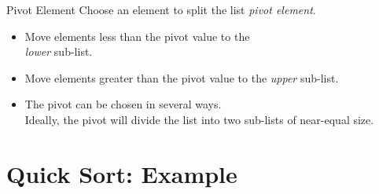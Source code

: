 \documentclass[14pt,aspectratio=1610]{beamer}
\begin{document}
\begin{frame}{Pivot Element}
Choose an element to split the list \emph{pivot element}.
\begin{itemize}\setlength\itemsep{0.5em}
\item
  Move elements less than the pivot value to the\\ \textit{lower} sub-list.
\item
  Move elements greater than the pivot value to the \textit{upper} sub-list.
\item
  The pivot can be chosen in several ways.\\
  Ideally, the pivot will divide the list into two sub-lists of near-equal size.
\end{itemize}
\end{frame}

\section{Quick Sort: Example}

\end{document}
